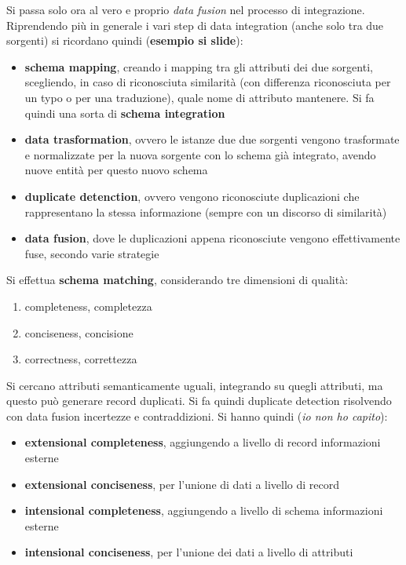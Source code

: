 \documentclass[a4paper,12pt, oneside]{book}
\begin{document}
Si passa solo ora al vero e proprio \textit{data fusion} nel processo di
integrazione.\\
Riprendendo più in generale i vari step di data integration (anche solo tra due
sorgenti) si ricordano quindi (\textbf{esempio si slide}): 
\begin{itemize}
  \item \textbf{schema mapping}, creando i mapping tra gli attributi dei due
  sorgenti, scegliendo, in caso di riconosciuta similarità (con differenza
  riconosciuta per un typo o per una traduzione), quale nome di attributo
  mantenere. Si fa quindi una sorta di \textbf{schema integration}
  \item \textbf{data trasformation}, ovvero le istanze due due sorgenti vengono
  trasformate e normalizzate per la nuova sorgente con lo schema già integrato,
  avendo nuove entità per questo nuovo schema
  \item \textbf{duplicate detenction}, ovvero vengono riconosciute duplicazioni
  che rappresentano la stessa informazione (sempre con un discorso di
  similarità) 
  \item \textbf{data fusion}, dove le duplicazioni appena riconosciute vengono
  effettivamente fuse, secondo varie strategie
\end{itemize}
Si effettua \textbf{schema matching}, considerando tre dimensioni di qualità:
\begin{enumerate}
  \item completeness, completezza
  \item conciseness, concisione
  \item correctness, correttezza
\end{enumerate}
Si cercano attributi semanticamente uguali, integrando su quegli attributi, ma
questo può generare record duplicati. Si fa quindi duplicate detection
risolvendo con data fusion incertezze e contraddizioni. Si hanno quindi
(\textit{io non ho capito}):
\begin{itemize}
  \item \textbf{extensional completeness}, aggiungendo a livello di record
  informazioni esterne
  \item \textbf{extensional conciseness}, per l'unione di dati a livello di
  record 
  \item \textbf{intensional completeness}, aggiungendo a livello di schema
  informazioni esterne
  \item \textbf{intensional conciseness}, per l'unione dei dati a livello di
  attributi
\end{itemize}
\end{document}
